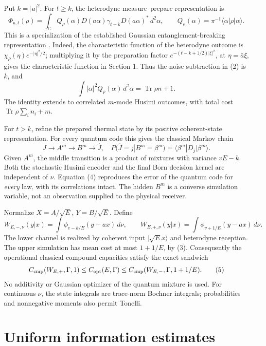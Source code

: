 \documentclass[11pt]{article}
\newcommand{\C}{\mathbb C}
\newcommand{\Tr}{\operatorname{Tr}}
\newcommand{\capq}{C_{\mathrm{opt}}}
\begin{document}
Put \(k=|a|^2\). For \(t\geq k\), the heterodyne measure--prepare
representation is
\[
 \Phi_{a,t}(\rho)=\int_\C Q_\rho(\alpha)
           D(a\alpha)\gamma_{t-k}D(a\alpha)^*\,d^2\alpha,\qquad
 Q_\rho(\alpha)=\pi^{-1}\langle\alpha|\rho|\alpha\rangle.       \tag{2}
\]
This is a specialization of the established Gaussian
entanglement-breaking representation \cite{holevoEB,holevoReview}.
Indeed, the characteristic function of the heterodyne outcome is
\(\chi_\rho(\eta)e^{-|\eta|^2/2}\); multiplying it by the preparation
factor \(e^{-(t-k+1/2)|\xi|^2}\), at \(\eta=\bar a\xi\), gives
the characteristic function in Section 1. Thus the noise subtraction
in (2) is \(k\), and
\[
 \int|\alpha|^2Q_\rho(\alpha)\,d^2\alpha=\Tr\rho n+1.          \tag{3}
\]
The identity extends to correlated \(m\)-mode Husimi outcomes, with
total cost \(\Tr\rho\sum_i n_i+m\).

For \(t>k\), refine the prepared thermal state by its positive
coherent-state representation. For every quantum code this gives the
classical Markov chain
\[
 J\longrightarrow A^m\longrightarrow B^m\longrightarrow\widehat J,
 \quad
 P(\widehat J=j|B^m=\beta^m)
   =\langle\beta^m|D_j|\beta^m\rangle .                       \tag{4}
\]
Given \(A^m\), the middle transition is a product of mixtures with
variance \(vE-k\). Both the stochastic Husimi encoder and the final Born
decision kernel are independent of \(\nu\). Equation (4) reproduces
the error of the quantum code for \emph{every} law, with its correlations
intact. The hidden \(B^m\) is a converse simulation variable, not an
observation supplied to the physical receiver.

Normalize \(X=A/\sqrt E\), \(Y=B/\sqrt E\). Define
\[
 W_{E,-,\nu}(y|x)=\int\phi_{v-k/E}(y-ax)\,d\nu,\qquad
 W_{E,+,\nu}(y|x)=\int\phi_{v+1/E}(y-ax)\,d\nu .
\]
The lower channel is realized by coherent input \(|\sqrt E x\rangle\)
and heterodyne reception. The upper simulation has mean cost at most
\(1+1/E\), by (3). Consequently the operational classical compound
capacities satisfy the exact sandwich
\[
 C_{\rm cmp}(W_{E,+},\Gamma,1)
 \leq \capq(E,\Gamma)
 \leq C_{\rm cmp}(W_{E,-},\Gamma,1+1/E).                     \tag{5}
\]
No additivity or Gaussian optimizer of the quantum mixture is used.
For continuous \(\nu\), the state integrals are trace-norm Bochner
integrals; probabilities and nonnegative moments also permit Tonelli.

\section{Uniform information estimates}
\end{document}
